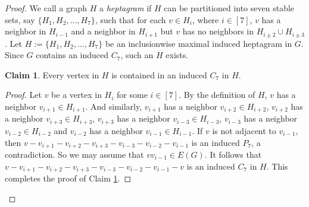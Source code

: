\documentclass[11pt,a4paper]{article}
\theoremstyle{definition}
\newtheorem{claim}{\indent Claim}
\begin{document}
\begin{proof}
    We call a graph $H$ a {\em heptagram} if $H$ can be partitioned into seven stable sets, say $\{H_1,H_2,\ldots,H_7\}$, such that for each $v\in H_i$, where $i\in [7]$, $v$ has a neighbor in $H_{i-1}$ and a neighbor in $H_{i+1}$ but $v$ has no neighbors in $H_{i\pm 2}\cup H_{i\pm 3}$. Let $H:=\{H_1,H_2,\ldots,H_7\}$ be an inclusionwise maximal induced heptagram in $G$. Since $G$ contains an induced $C_7$, such an $H$ exists. 

    \begin{claim}\label{claim:C_7 property in H}
        Every vertex in $H$ is contained in an induced $C_7$ in $H$.
    \end{claim}
    \begin{proof}
        Let $v$ be a vertex in $H_i$ for some $i\in [7]$. 
        By the definition of $H$, $v$ has a neighbor $v_{i+1}\in H_{i+1}$. 
        And similarly, $v_{i+1}$ has a neighbor $v_{i+2}\in H_{i+2}$, $v_{i+2}$ has a neighbor $v_{i+3}\in H_{i+3}$, $v_{i+3}$ has a neighbor $v_{i-3}\in H_{i-3}$, $v_{i-3}$ has a neighbor $v_{i-2}\in H_{i-2}$ and $v_{i-2}$ has a neighbor $v_{i-1}\in H_{i-1}$. 
        If $v$ is not adjacent to $v_{i-1}$, then $v-v_{i+1}-v_{i+2}-v_{i+3}-v_{i-3}-v_{i-2}-v_{i-1}$ is an induced $P_7$, a contradiction. 
        So we may assume that $vv_{i-1}\in E(G)$. 
        It follows that $v-v_{i+1}-v_{i+2}-v_{i+3}-v_{i-3}-v_{i-2}-v_{i-1}-v$ is an induced $C_7$ in $H$. 
        This completes the proof of Claim \ref{claim:C_7 property in H}.
    \end{proof}
    

\end{proof}
\end{document}
